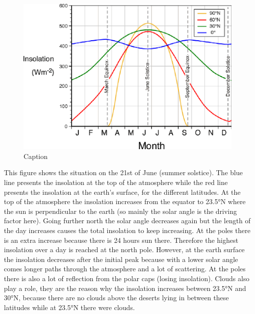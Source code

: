 \documentclass[12pt,oneside]{book}
\begin{document}
\begin{figure}

{\centering \includegraphics[width=0.8\linewidth]{figures/Figure27} 

}

\caption{Caption}\label{fig:Insolation}
\end{figure}

This figure shows the situation on the 21st of June (summer solstice).
The blue line presents the insolation at the top of the atmosphere while
the red line presents the insolation at the earth's surface, for the
different latitudes. At the top of the atmosphere the insolation
increases from the equator to 23.5°N where the sun is perpendicular to
the earth (so mainly the solar angle is the driving factor here). Going
further north the solar angle decreases again but the length of the day
increases causes the total insolation to keep increasing. At the poles
there is an extra increase because there is 24 hours sun there.
Therefore the highest insolation over a day is reached at the north
pole. However, at the earth surface the insolation decreases after the
initial peak because with a lower solar angle comes longer paths through
the atmosphere and a lot of scattering. At the poles there is also a lot
of reflection from the polar caps (losing insolation). Clouds also play
a role, they are the reason why the insolation increases between 23.5°N
and 30°N, because there are no clouds above the deserts lying in between
these latitudes while at 23.5°N there were clouds.
\end{document}
